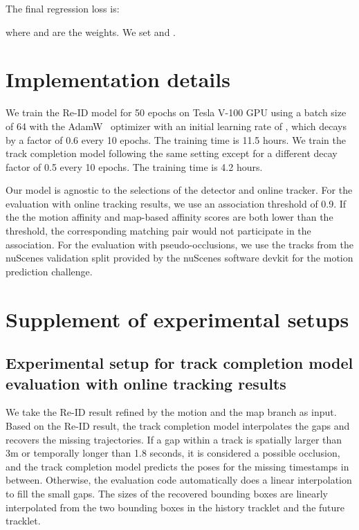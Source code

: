 \documentclass{article} \usepackage{iclr2023_conference,times}
\begin{document}
The final regression loss  is:

where  and  are the weights. We set  and .

\section{Implementation details}
\label{sec: implementation details}
We train the Re-ID model for 50 epochs on Tesla V-100 GPU using a batch size of 64 with the AdamW~\cite{AdamW} optimizer with an initial learning rate of , which decays by a factor of 0.6 every 10 epochs. The training time is 11.5 hours. We train the track completion model following the same setting except for a different decay factor of 0.5 every 10 epochs. The training time is 4.2 hours. 

Our model is agnostic to the selections of the detector and online tracker. For the evaluation with online tracking results, we use an association threshold of 0.9. If the the motion affinity and map-based affinity scores are both lower than the threshold, the corresponding matching pair would not participate in the association. For the evaluation with pseudo-occlusions, we use the tracks from the nuScenes validation split provided by the nuScenes software devkit for the motion prediction challenge. 
\section{Supplement of experimental setups}
\label{sec: experimental setup}
\subsection{Experimental setup for track completion model evaluation with online tracking results}
\label{sec: Track completion evaluation online setup}
We take the Re-ID result refined by the motion and the map branch as input. Based on the Re-ID result, the track completion model interpolates the gaps and recovers the missing trajectories. If a gap within a track is spatially larger than 3m or temporally longer than 1.8 seconds, it is considered a possible occlusion, and the track completion model predicts the poses for the missing timestamps in between. Otherwise, the evaluation code automatically does a linear interpolation to fill the small gaps. The sizes of the recovered bounding boxes are linearly interpolated from the two bounding boxes in the history tracklet and the future tracklet. 
\end{document}
